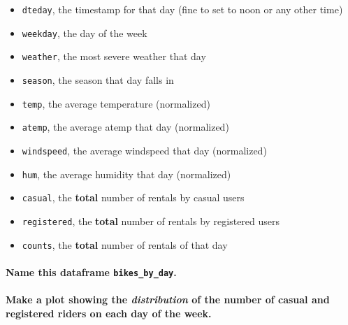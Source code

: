 \documentclass[11pt]{article}
\providecommand{\tightlist}{%
      \setlength{\itemsep}{0pt}\setlength{\parskip}{0pt}}
\begin{document}
\begin{itemize}
\tightlist
\item
  \texttt{dteday}, the timestamp for that day (fine to set to noon or
  any other time)
\item
  \texttt{weekday}, the day of the week
\item
  \texttt{weather}, the most severe weather that day
\item
  \texttt{season}, the season that day falls in
\item
  \texttt{temp}, the average temperature (normalized)
\item
  \texttt{atemp}, the average atemp that day (normalized)
\item
  \texttt{windspeed}, the average windspeed that day (normalized)
\item
  \texttt{hum}, the average humidity that day (normalized)
\item
  \texttt{casual}, the \textbf{total} number of rentals by casual users
\item
  \texttt{registered}, the \textbf{total} number of rentals by
  registered users
\item
  \texttt{counts}, the \textbf{total} number of rentals of that day
\end{itemize}

\paragraph{\texorpdfstring{Name this dataframe
\texttt{bikes\_by\_day}.}{Name this dataframe bikes\_by\_day.}}\label{name-this-dataframe-bikes_by_day.}

\paragraph{\texorpdfstring{Make a plot showing the \emph{distribution}
of the number of casual and registered riders on each day of the
week.}{Make a plot showing the distribution of the number of casual and registered riders on each day of the week.}}\label{make-a-plot-showing-the-distribution-of-the-number-of-casual-and-registered-riders-on-each-day-of-the-week.}
\end{document}
